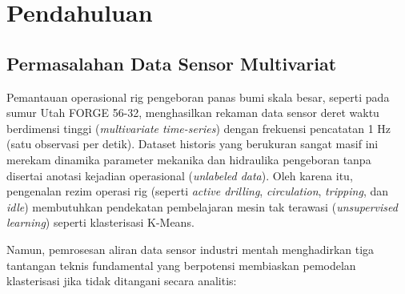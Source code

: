 \documentclass[conference]{IEEEtran}
\begin{document}
\section{Pendahuluan}

\subsection{Permasalahan Data Sensor Multivariat}
Pemantauan operasional rig pengeboran panas bumi skala besar, seperti pada sumur Utah FORGE 56-32, menghasilkan rekaman data sensor deret waktu berdimensi tinggi (\textit{multivariate time-series}) dengan frekuensi pencatatan 1 Hz (satu observasi per detik). Dataset historis yang berukuran sangat masif ini merekam dinamika parameter mekanika dan hidraulika pengeboran tanpa disertai anotasi kejadian operasional (\textit{unlabeled data}). Oleh karena itu, pengenalan rezim operasi rig (seperti \textit{active drilling}, \textit{circulation}, \textit{tripping}, dan \textit{idle}) membutuhkan pendekatan pembelajaran mesin tak terawasi (\textit{unsupervised learning}) seperti klasterisasi K-Means.

Namun, pemrosesan aliran data sensor industri mentah menghadirkan tiga tantangan teknis fundamental yang berpotensi membiaskan pemodelan klasterisasi jika tidak ditangani secara analitis:
\end{document}
